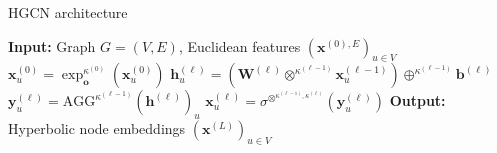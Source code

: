 \begin{algorithm}
    \caption*{HGCN architecture}
    \begin{algorithmic}
    \State \textbf{Input:} Graph $G=(V, E)$, Euclidean features $(\mathbf{x}^{(0), E})_{u\in V}$
    \State 
    \State $\mathbf{x}^{(0)}_u = \exp_{\mathbf{o}}^{\kappa^{(0)}}(\mathbf{x}^{(0)}_u)$ 
            \State $\mathbf{h}^{(\ell)}_u = (\mathbf{W}^{(\ell)} \otimes^{\kappa^{(\ell-1)}} \mathbf{x}^{(\ell-1)}_u) \oplus^{\kappa^{(\ell-1)}} \mathbf{b}^{(\ell)}$ 
            \State $\mathbf{y}^{(\ell)}_u = \text{AGG}^{\kappa^{(\ell-1)}}(\mathbf{h}^{(\ell)})_u$ 
            \State $\mathbf{x}^{(\ell)}_u = \sigma^{\otimes^{\kappa^{(\ell-1)}, \kappa^{(\ell)}}}(\mathbf{y}^{(\ell)}_u)$ 
        \EndFor
    \EndFor
    \State
    \State \textbf{Output:} Hyperbolic node embeddings $(\mathbf{x}^{(L)})_{u\in V}$
    \end{algorithmic}
    \label{alg:HGCN}
\end{algorithm}
